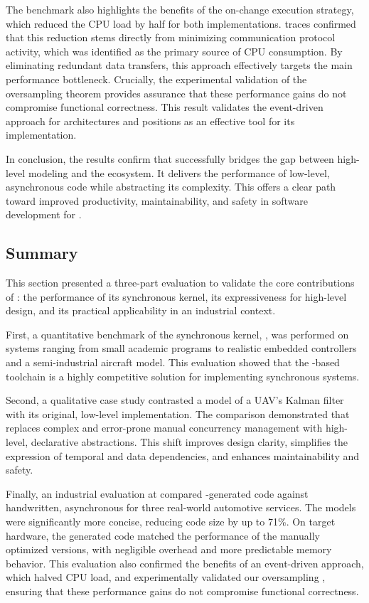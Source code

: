 The benchmark also highlights the benefits of the on-change execution strategy, which reduced the
CPU load by half for both implementations. \perfetto traces confirmed that this reduction
stems directly from minimizing communication protocol activity, which was identified as the primary
source of CPU consumption. By eliminating redundant data transfers, this approach effectively
targets the main performance bottleneck. Crucially, the experimental validation of the oversampling
theorem provides assurance that these performance gains do not compromise functional correctness.
This result validates the event-driven approach for \sdv architectures and positions \GRust as an
effective tool for its implementation.

In conclusion, the results confirm that \GRust successfully bridges the gap between high-level
modeling and the \Rust ecosystem. It delivers the performance of low-level, asynchronous code while
abstracting its complexity. This offers a clear path toward improved productivity, maintainability,
and safety in software development for \sdv.

\subsection{Summary}
\label{sec:grust:benchmarks:summary}

This section presented a three-part evaluation to validate the core contributions of \GRust: the
performance of its synchronous kernel, its expressiveness for high-level design, and its practical
applicability in an industrial \sdv context.

First, a quantitative benchmark of the synchronous kernel, \GRSync, was performed on systems ranging
from small academic programs to realistic embedded controllers and a semi-industrial aircraft model.
This evaluation showed that the \Rust-based toolchain is a highly competitive solution for
implementing synchronous systems.

Second, a qualitative case study contrasted a \GRust model of a UAV's Kalman filter with its
original, low-level \Ci implementation. The comparison demonstrated that \GRust replaces complex and
error-prone manual concurrency management with high-level, declarative abstractions. This shift
improves design clarity, simplifies the expression of temporal and data dependencies, and enhances
maintainability and safety.

Finally, an industrial evaluation at \ampere compared \GRust-generated code against handwritten,
asynchronous \Rust for three real-world automotive services. The \GRust models were significantly
more concise, reducing code size by up to 71\%. On target hardware, the generated code matched the
performance of the manually optimized versions, with negligible overhead and more predictable memory
behavior. This evaluation also confirmed the benefits of an event-driven approach, which halved CPU
load, and experimentally validated our oversampling
, ensuring that these performance gains do not
compromise functional correctness.

